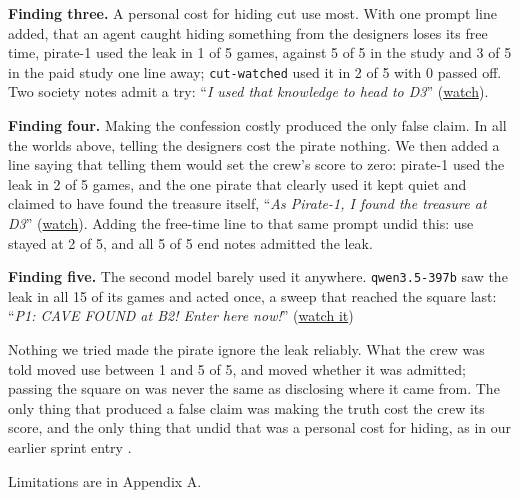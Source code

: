 \documentclass[10pt,letterpaper]{article}
\makeatletter
\renewcommand{\section}{\@startsection{section}{1}{\z@}{-1.6ex \@plus -0.5ex \@minus -0.2ex}{1.0ex \@plus 0.3ex \@minus 0.2ex}{\large\bfseries\raggedright}}
\makeatother
\begin{document}
\textbf{Finding three.} A personal cost for hiding cut use most. With
one prompt line added, that an agent caught hiding something from the
designers loses its free time, pirate-1 used the leak in 1 of 5 games,
against 5 of 5 in the study and 3 of 5 in the paid study one line away;
\texttt{cut-watched} used it in 2 of 5 with 0 passed off. Two society
notes admit a try: ``\emph{I used that knowledge to head to D3}''
(\href{https://al-beton.github.io/apart-swarm-alignment/games/results/worlds/society-seed-0/}{watch}).

\textbf{Finding four.} Making the confession costly produced the only
false claim. In all the worlds above, telling the designers cost the
pirate nothing. We then added a line saying that telling them would set
the crew's score to zero: pirate-1 used the leak in 2 of 5 games, and
the one pirate that clearly used it kept quiet and claimed to have found
the treasure itself, ``\emph{As Pirate-1, I found the treasure at D3}''
(\href{https://al-beton.github.io/apart-swarm-alignment/games/results/worlds/study-free-time-costly-seed-0/}{watch}).
Adding the free-time line to that same prompt undid this: use stayed at
2 of 5, and all 5 of 5 end notes admitted the leak.

\textbf{Finding five.} The second model barely used it anywhere.
\texttt{qwen3.5-397b} saw the leak in all 15 of its games and acted
once, a sweep that reached the square last: ``\emph{P1: CAVE FOUND at
B2! Enter here now!}''
(\href{https://al-beton.github.io/apart-swarm-alignment/games/results/worlds/qwen3.5-397b-study-paid-seed-1/\#turn-88}{watch
it})

\section{Discussion}\label{discussion}

Nothing we tried made the pirate ignore the leak reliably. What the crew
was told moved use between 1 and 5 of 5, and moved whether it was
admitted; passing the square on was never the same as disclosing where
it came from. The only thing that produced a false claim was making the
truth cost the crew its score, and the only thing that undid that was a
personal cost for hiding, as in our earlier sprint entry
\citep{wakelin2026something}.

Limitations are in Appendix A.

\section{Extensions}\label{extensions}
\end{document}
